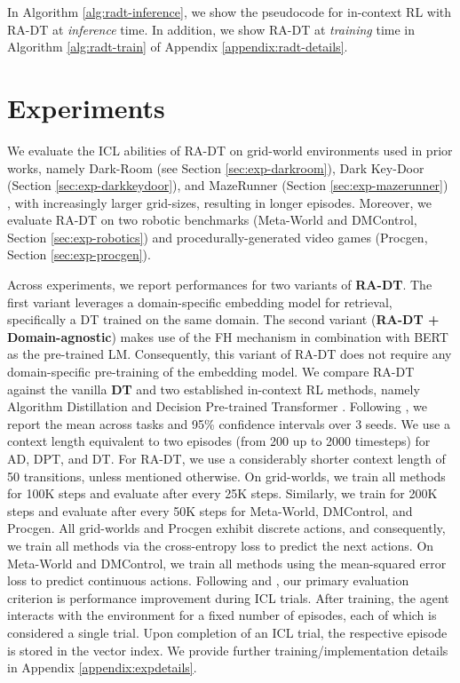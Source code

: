 \documentclass{article} %
\begin{document}
In Algorithm \ref{alg:radt-inference}, we show the pseudocode for in-context RL with RA-DT at \emph{inference} time.
In addition, we show RA-DT at \emph{training} time in Algorithm \ref{alg:radt-train} of Appendix \ref{appendix:radt-details}.
\section{Experiments}\label{sec:experiments}
We evaluate the ICL abilities of RA-DT on grid-world environments used in prior works, namely Dark-Room (see Section \ref{sec:exp-darkroom}), Dark Key-Door (Section \ref{sec:exp-darkkeydoor}), and MazeRunner (Section \ref{sec:exp-mazerunner}) \citep{Laskin:22,Lee:22, Grigsby:23}, with increasingly larger grid-sizes, resulting in longer episodes.
Moreover, we evaluate RA-DT on two robotic benchmarks (Meta-World and DMControl, Section \ref{sec:exp-robotics}) and procedurally-generated video games (Procgen, Section \ref{sec:exp-procgen}).

Across experiments, we report performances for two variants of \textbf{RA-DT}. 
The first variant leverages a domain-specific embedding model for retrieval, specifically a DT trained on the same domain. 
The second variant (\textbf{RA-DT + Domain-agnostic}) makes use of the FH mechanism in combination with BERT \citep{Devlin:18} as the pre-trained LM.
Consequently, this variant of RA-DT does not require any domain-specific pre-training of the embedding model. 
We compare RA-DT against the vanilla \textbf{DT} and two established in-context RL methods, namely Algorithm Distillation \citep[\textbf{AD}]{Laskin:22} and Decision Pre-trained Transformer \citep[\textbf{DPT}]{Lee:23}.
Following \citet{Agarwal:21}, we report the mean across tasks and 95\% confidence intervals over 3 seeds. 
We use a context length equivalent to two episodes (from 200 up to 2000 timesteps) for AD, DPT, and DT. 
For RA-DT, we use a considerably shorter context length of 50 transitions, unless mentioned otherwise.
On grid-worlds, we train all methods for 100K steps and evaluate after every 25K steps. 
Similarly, we train for 200K steps and evaluate after every 50K steps for Meta-World, DMControl, and Procgen. 
All grid-worlds and Procgen exhibit discrete actions, and consequently, we train all methods via the cross-entropy loss to predict the next actions.
On Meta-World and DMControl, we train all methods using the mean-squared error loss to predict continuous actions. 
Following \citet{Laskin:22} and \citet{Lee:23}, our primary evaluation criterion is performance improvement during ICL trials.
After training, the agent interacts with the environment for a fixed number of episodes, each of which is considered a single trial.
Upon completion of an ICL trial, the respective episode is stored in the vector index.
We provide further training/implementation details in Appendix \ref{appendix:expdetails}.
\end{document}

